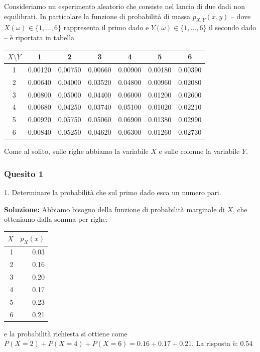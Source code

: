 \documentclass[12pt, a4paper]{article}
\begin{document}
\vspace{0.5cm}
\begin{tcolorbox}[colback=lightergray!10, colframe=tocsec, title=\textbf{Esercizio 13}]
Consideriamo un esperimento aleatorio che consiste nel lancio di due dadi non equilibrati. In particolare la funzione di probabilità di massa $p_{X,Y}(x,y)$ – dove $X(\omega) \in \{1,\dots,6\}$ rappresenta il primo dado e $Y(\omega) \in \{1,\dots,6\}$ il secondo dado – è riportata in tabella
\begin{center}
\begin{tabular}{c|cccccc}
\toprule
$X \setminus Y$ & 1 & 2 & 3 & 4 & 5 & 6 \\
\midrule
1 & 0.00120 & 0.00750 & 0.00660 & 0.00900 & 0.00180 & 0.00390 \\
2 & 0.00640 & 0.04000 & 0.03520 & 0.04800 & 0.00960 & 0.02080 \\
3 & 0.00800 & 0.05000 & 0.04400 & 0.06000 & 0.01200 & 0.02600 \\
4 & 0.00680 & 0.04250 & 0.03740 & 0.05100 & 0.01020 & 0.02210 \\
5 & 0.00920 & 0.05750 & 0.05060 & 0.06900 & 0.01380 & 0.02990 \\
6 & 0.00840 & 0.05250 & 0.04620 & 0.06300 & 0.01260 & 0.02730 \\
\bottomrule
\end{tabular}
\end{center}
Come al solito, sulle righe abbiamo la variabile $X$ e sulle colonne la variabile $Y$.
\end{tcolorbox}

\newpage

\subsubsection*{Quesito 1}
1. Determinare la probabilità che sul primo dado esca un numero pari.

\textbf{Soluzione:}
Abbiamo bisogno della funzione di probabilità marginale di $X$, che otteniamo dalla somma per righe:
\begin{center}
\begin{tabular}{rr}
\hline
 $X$ & $p_X(x)$ \\ 
\hline
  1 & 0.03 \\ 
  2 & 0.16 \\ 
  3 & 0.20 \\ 
  4 & 0.17 \\ 
  5 & 0.23 \\ 
  6 & 0.21 \\ 
\hline
\end{tabular}
\end{center}
e la probabilità richiesta si ottiene come $P(X=2)+P(X=4)+P(X=6) = 0.16 + 0.17 + 0.21$.
La risposta è: 0.54
\end{document}
